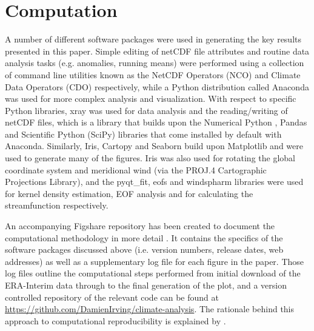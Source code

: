 \section{Computation}

A number of different software packages were used in generating the key results presented in this paper. Simple editing of netCDF file attributes and routine data analysis tasks (e.g. anomalies, running means) were performed using a collection of command line utilities known as the NetCDF Operators (NCO) and Climate Data Operators (CDO) respectively, while a Python distribution called Anaconda was used for more complex analysis and visualization. With respect to specific Python libraries, xray was used for data analysis and the reading/writing of netCDF files, which is a library that builds upon the Numerical Python \citep[NumPy;][]{VanDerWalt2011}, Pandas and Scientific Python (SciPy) libraries that come installed by default with Anaconda. Similarly, Iris, Cartopy and Seaborn build upon Matplotlib \citep[the default Python plotting library;][]{Hunter2007} and were used to generate many of the figures. Iris was also used for rotating the global coordinate system and meridional wind (via the PROJ.4 Cartographic Projections Library), and the pyqt\_fit, eofs \citep{Dawson2016} and windspharm \citep{Dawson2016a} libraries were used for kernel density estimation, EOF analysis and for calculating the streamfunction respectively.

An accompanying Figshare repository has been created to document the computational methodology in more detail \citep{Irving2016a}. It contains the specifics of the software packages discussed above (i.e. version numbers, release dates, web addresses) as well as a supplementary log file for each figure in the paper. Those log files outline the computational steps performed from initial download of the ERA-Interim data through to the final generation of the plot, and a version controlled repository of the relevant code can be found at \url{https://github.com/DamienIrving/climate-analysis}. The rationale behind this approach to computational reproducibility is explained by \citet{Irving2016}.